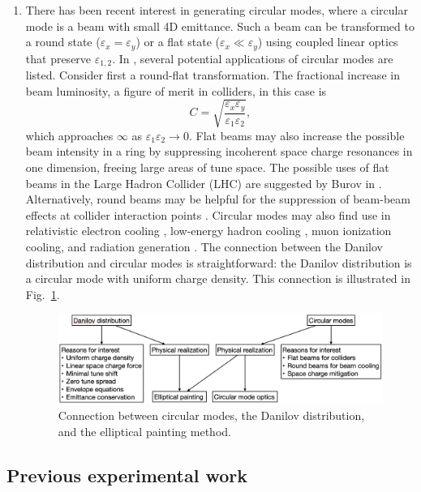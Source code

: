 \begin{enumerate}
\item
There has been recent interest in generating circular modes, where a circular mode is a beam with small 4D emittance. Such a beam can be transformed to a round state ($\varepsilon_x = \varepsilon_y$) or a flat state ($\varepsilon_x \ll \varepsilon_y$) using coupled linear optics that preserve $\varepsilon_{1,2}$. In \cite{Burov2002}, several potential applications of circular modes are listed. Consider first a round-flat transformation. The fractional increase in beam luminosity, a figure of merit in colliders, in this case is
%
\begin{equation}
    C = \sqrt{\frac{\varepsilon_x\varepsilon_y}{\varepsilon_1\varepsilon_2}},
\end{equation}
%
which approaches $\infty$ as $\varepsilon_1\varepsilon_2 \rightarrow 0$. Flat beams may also increase the possible beam intensity in a ring by suppressing incoherent space charge resonances in one dimension, freeing large areas of tune space. The possible uses of flat beams in the Large Hadron Collider (LHC) are suggested by Burov in \cite{Burov2013}. Alternatively, round beams may be helpful for the suppression of beam-beam effects at collider interaction points \cite{Danilo1996}. Circular modes may also find use in relativistic electron cooling \cite{Burov2000}, low-energy hadron cooling \cite{Derbenev2000}, muon ionization cooling, and radiation generation \cite{Corlett2001}. The connection between the Danilov distribution and circular modes is straightforward: the Danilov distribution is a circular mode with uniform charge density. This connection is illustrated in Fig.~\ref{fig:circular_modes_diagram}.
%
\begin{figure}[!p]
    \centering
    \includegraphics[width=\textwidth]{Images/chapter1/diagram.png}
    \caption{Connection between circular modes, the Danilov distribution, and the elliptical painting method.}
    \label{fig:circular_modes_diagram}
\end{figure}
%

\end{enumerate}

\subsection{Previous experimental work}


